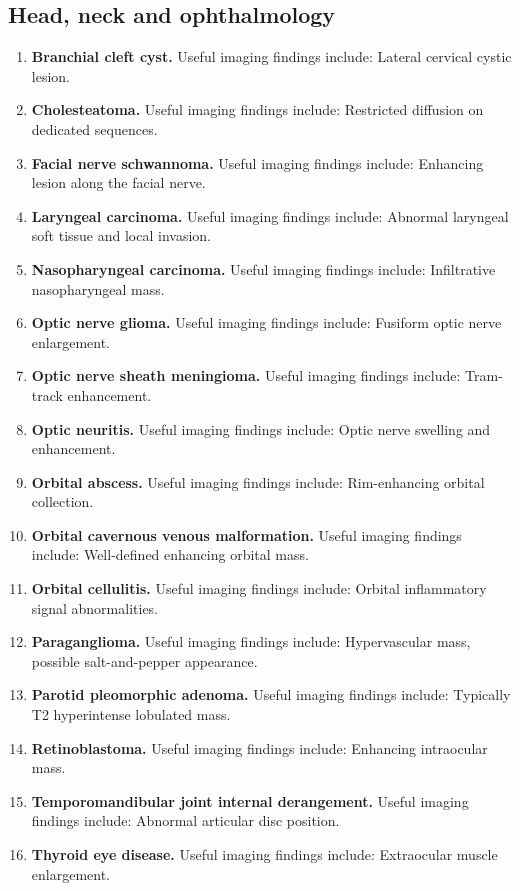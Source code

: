 \subsection{Head, neck and ophthalmology}
\begin{enumerate}[leftmargin=*,itemsep=0.45em,topsep=0.4em]
\item \textbf{Branchial cleft cyst.} Useful imaging findings include: Lateral cervical cystic lesion.
\item \textbf{Cholesteatoma.} Useful imaging findings include: Restricted diffusion on dedicated sequences.
\item \textbf{Facial nerve schwannoma.} Useful imaging findings include: Enhancing lesion along the facial nerve.
\item \textbf{Laryngeal carcinoma.} Useful imaging findings include: Abnormal laryngeal soft tissue and local invasion.
\item \textbf{Nasopharyngeal carcinoma.} Useful imaging findings include: Infiltrative nasopharyngeal mass.
\item \textbf{Optic nerve glioma.} Useful imaging findings include: Fusiform optic nerve enlargement.
\item \textbf{Optic nerve sheath meningioma.} Useful imaging findings include: Tram-track enhancement.
\item \textbf{Optic neuritis.} Useful imaging findings include: Optic nerve swelling and enhancement.
\item \textbf{Orbital abscess.} Useful imaging findings include: Rim-enhancing orbital collection.
\item \textbf{Orbital cavernous venous malformation.} Useful imaging findings include: Well-defined enhancing orbital mass.
\item \textbf{Orbital cellulitis.} Useful imaging findings include: Orbital inflammatory signal abnormalities.
\item \textbf{Paraganglioma.} Useful imaging findings include: Hypervascular mass, possible salt-and-pepper appearance.
\item \textbf{Parotid pleomorphic adenoma.} Useful imaging findings include: Typically T2 hyperintense lobulated mass.
\item \textbf{Retinoblastoma.} Useful imaging findings include: Enhancing intraocular mass.
\item \textbf{Temporomandibular joint internal derangement.} Useful imaging findings include: Abnormal articular disc position.
\item \textbf{Thyroid eye disease.} Useful imaging findings include: Extraocular muscle enlargement.

\end{enumerate}
